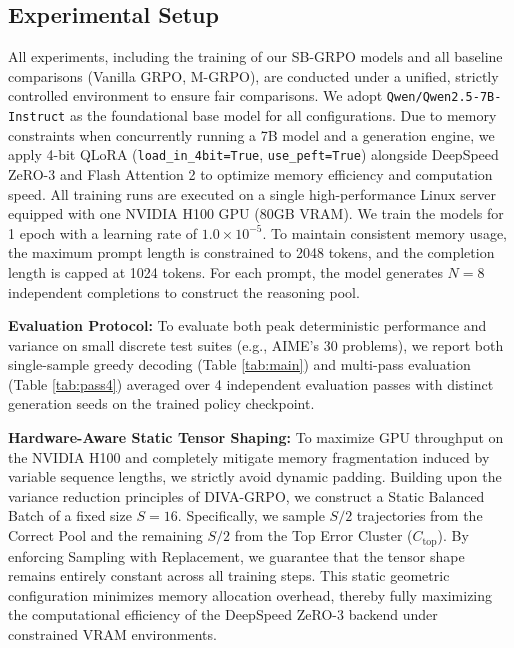 \subsection{Experimental Setup}
All experiments, including the training of our SB-GRPO models and all baseline comparisons (Vanilla GRPO, M-GRPO), are conducted under a unified, strictly controlled environment to ensure fair comparisons. We adopt \texttt{Qwen/}\allowbreak\texttt{Qwen2.5-7B-Instruct} as the foundational base model for all configurations. Due to memory constraints when concurrently running a 7B model and a generation engine, we apply 4-bit QLoRA \cite{hu2021loralowrankadaptationlarge,dettmers2023qloraefficientfinetuningquantized} (\texttt{load\_in\_4bit=True}, \texttt{use\_peft=True}) alongside DeepSpeed ZeRO-3 and Flash Attention 2 to optimize memory efficiency and computation speed. All training runs are executed on a single high-performance Linux server equipped with one NVIDIA H100 GPU (80GB VRAM). We train the models for 1 epoch with a learning rate of $1.0 \times 10^{-5}$. To maintain consistent memory usage, the maximum prompt length is constrained to 2048 tokens, and the completion length is capped at 1024 tokens. For each prompt, the model generates $N=8$ independent completions to construct the reasoning pool.

\textbf{Evaluation Protocol:} To evaluate both peak deterministic performance and variance on small discrete test suites (e.g., AIME's 30 problems), we report both single-sample greedy decoding (Table \ref{tab:main}) and multi-pass evaluation (Table \ref{tab:pass4}) averaged over 4 independent evaluation passes with distinct generation seeds on the trained policy checkpoint.

\textbf{Hardware-Aware Static Tensor Shaping:} To maximize GPU throughput on the NVIDIA H100 and completely mitigate memory fragmentation induced by variable sequence lengths, we strictly avoid dynamic padding. Building upon the variance reduction principles of DIVA-GRPO, we construct a Static Balanced Batch of a fixed size $S = 16$. Specifically, we sample $S/2$ trajectories from the Correct Pool and the remaining $S/2$ from the Top Error Cluster ($C_{\text{top}}$). By enforcing Sampling with Replacement, we guarantee that the tensor shape remains entirely constant across all training steps. This static geometric configuration minimizes memory allocation overhead, thereby fully maximizing the computational efficiency of the DeepSpeed ZeRO-3 backend under constrained VRAM environments.